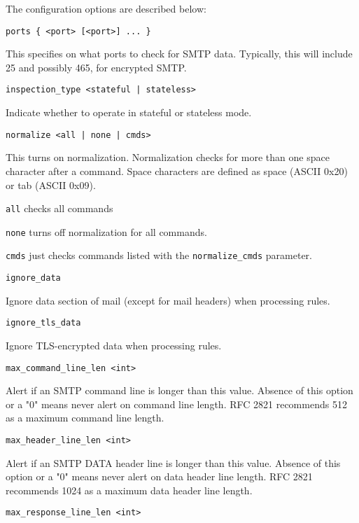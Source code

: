 \documentclass[english]{report}
\newcounter{slistnum}
\newenvironment{slist}
{ \begin{list}{ {\bf \arabic{slistnum}.} }{\usecounter{slistnum} } }
{ \end{list} }
\begin{document}
The configuration options are described below:

\begin{slist}

\item \texttt{ports \{ <port> [<port>] ... \}}

This specifies on what ports to check for SMTP data.  Typically, this will
include 25 and possibly 465, for encrypted SMTP.

\item \texttt{inspection\_type <stateful | stateless>}

Indicate whether to operate in stateful or stateless mode.

\item \texttt{normalize <all | none | cmds>}

This turns on normalization.  Normalization checks for more than one space
character after a command.  Space characters are defined as space (ASCII 0x20)
or tab (ASCII 0x09).

\texttt{all} checks all commands

\texttt{none} turns off normalization for all commands.

\texttt{cmds} just checks commands listed with the \texttt{normalize\_cmds} parameter.

\item \texttt{ignore\_data}

Ignore data section of mail (except for mail headers) when processing rules.

\item \texttt{ignore\_tls\_data}

Ignore TLS-encrypted data when processing rules.

\item \texttt{max\_command\_line\_len <int>}

Alert if an SMTP command line is longer than this value.  Absence of this
option or a "0" means never alert on command line length.
RFC 2821 recommends 512 as a maximum command line length.

\item \texttt{max\_header\_line\_len <int>}

Alert if an SMTP DATA header line is longer than this value.  Absence of this
option or a "0" means never alert on data header line length.
RFC 2821 recommends 1024 as a maximum data header line length.

\item \texttt{max\_response\_line\_len <int>}


\end{slist}
\end{document}
